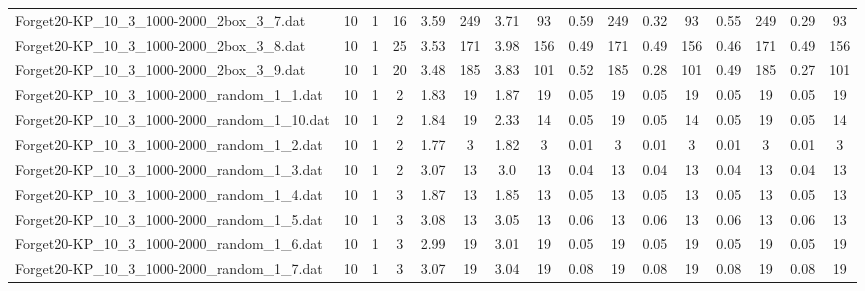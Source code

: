 \begin{sidewaystable}[!ht]
{\begin{tabular}{lccccccccccccccc}
Forget20-KP\_10\_3\_1000-2000\_2box\_3\_7.dat & 10 & 1 & 16 & 3.59 & 249 & 3.71 & 93 & 0.59 & 249 & 0.32 & 93 & 0.55 & 249 &  \textcolor{blue2}{0.29} & 93 \\
Forget20-KP\_10\_3\_1000-2000\_2box\_3\_8.dat & 10 & 1 & 25 & 3.53 & 171 & 3.98 & 156 & 0.49 & 171 & 0.49 & 156 &  \textcolor{blue2}{0.46} & 171 & 0.49 & 156 \\
Forget20-KP\_10\_3\_1000-2000\_2box\_3\_9.dat & 10 & 1 & 20 & 3.48 & 185 & 3.83 & 101 & 0.52 & 185 & 0.28 & 101 & 0.49 & 185 &  \textcolor{blue2}{0.27} & 101 \\
Forget20-KP\_10\_3\_1000-2000\_random\_1\_1.dat & 10 & 1 & 2 & 1.83 & 19 & 1.87 & 19 &  \textcolor{blue2}{0.05} & 19 &  \textcolor{blue2}{0.05} & 19 &  \textcolor{blue2}{0.05} & 19 &  \textcolor{blue2}{0.05} & 19 \\
Forget20-KP\_10\_3\_1000-2000\_random\_1\_10.dat & 10 & 1 & 2 & 1.84 & 19 & 2.33 & 14 &  \textcolor{blue2}{0.05} & 19 &  \textcolor{blue2}{0.05} & 14 &  \textcolor{blue2}{0.05} & 19 &  \textcolor{blue2}{0.05} & 14 \\
Forget20-KP\_10\_3\_1000-2000\_random\_1\_2.dat & 10 & 1 & 2 & 1.77 & 3 & 1.82 & 3 &  \textcolor{blue2}{0.01} & 3 &  \textcolor{blue2}{0.01} & 3 &  \textcolor{blue2}{0.01} & 3 &  \textcolor{blue2}{0.01} & 3 \\
Forget20-KP\_10\_3\_1000-2000\_random\_1\_3.dat & 10 & 1 & 2 & 3.07 & 13 & 3.0 & 13 &  \textcolor{blue2}{0.04} & 13 &  \textcolor{blue2}{0.04} & 13 &  \textcolor{blue2}{0.04} & 13 &  \textcolor{blue2}{0.04} & 13 \\
Forget20-KP\_10\_3\_1000-2000\_random\_1\_4.dat & 10 & 1 & 3 & 1.87 & 13 & 1.85 & 13 &  \textcolor{blue2}{0.05} & 13 &  \textcolor{blue2}{0.05} & 13 &  \textcolor{blue2}{0.05} & 13 &  \textcolor{blue2}{0.05} & 13 \\
Forget20-KP\_10\_3\_1000-2000\_random\_1\_5.dat & 10 & 1 & 3 & 3.08 & 13 & 3.05 & 13 &  \textcolor{blue2}{0.06} & 13 &  \textcolor{blue2}{0.06} & 13 &  \textcolor{blue2}{0.06} & 13 &  \textcolor{blue2}{0.06} & 13 \\
Forget20-KP\_10\_3\_1000-2000\_random\_1\_6.dat & 10 & 1 & 3 & 2.99 & 19 & 3.01 & 19 &  \textcolor{blue2}{0.05} & 19 &  \textcolor{blue2}{0.05} & 19 &  \textcolor{blue2}{0.05} & 19 &  \textcolor{blue2}{0.05} & 19 \\
Forget20-KP\_10\_3\_1000-2000\_random\_1\_7.dat & 10 & 1 & 3 & 3.07 & 19 & 3.04 & 19 &  \textcolor{blue2}{0.08} & 19 &  \textcolor{blue2}{0.08} & 19 &  \textcolor{blue2}{0.08} & 19 &  \textcolor{blue2}{0.08} & 19 \\

\end{tabular}}
\end{sidewaystable}
